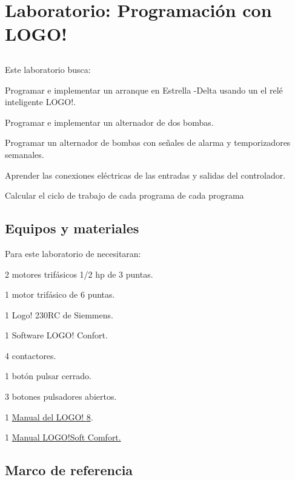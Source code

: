 \chapter{Laboratorio:  Programación con LOGO!}
	  
\section{\obj}
Este  laboratorio busca:
\begin{itemize}
	{\small
    \item Programar e implementar un arranque en Estrella -Delta usando un el relé inteligente LOGO!.
    \item Programar e implementar un alternador de dos bombas.
    \item Programar un alternador de bombas con señales de alarma y temporizadores semanales.
    \item Aprender las conexiones eléctricas de las entradas y salidas del controlador.
    \item Calcular el ciclo de trabajo de cada programa de cada programa 
 }
\end{itemize} 

 
\section{Equipos y materiales}
Para este laboratorio de necesitaran:
\begin{itemize}
	{\small \item 2 motores trifásicos 1/2 hp de 3 puntas.
		\item 1 motor trifásico de 6 puntas.
	\item 1 Logo! 230RC de Siemmens.
	\item 1 Software LOGO! Confort.
	\item 4 contactores.
	\item 1 botón pulsar cerrado.
	\item 3 botones pulsadores abiertos.
	\item 1 \href{https://cache.industry.siemens.com/dl/files/041/109741041/att_924629/v1/logo_system_manual_es-ES_es-ES.pdf}{Manual del LOGO! 8}.
	\item 1 \href{https://cache.industry.siemens.com/dl/files/807/100782807/att_924633/v1/Help_es-ES_es-ES.pdf}{Manual LOGO!Soft Comfort.}
}
\end{itemize}

\section{Marco de referencia}

